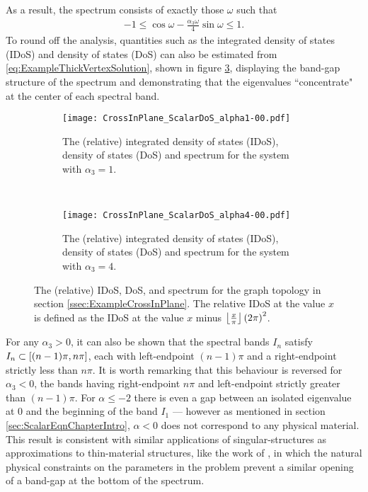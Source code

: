 As a result, the spectrum consists of exactly those $\omega$ such that
\begin{align*}
	-1 \leq \cos\omega - \frac{\alpha_3\omega}{4}\sin\omega \leq 1.
\end{align*}
To round off the analysis, quantities such as the integrated density of states (IDoS) and density of states (DoS) can also be estimated from \eqref{eq:ExampleThickVertexSolution}, shown in figure \ref{fig:CrossInPlane_ScalarDoS}, displaying the band-gap structure of the spectrum and demonstrating that the eigenvalues ``concentrate" at the center of each spectral band.
\begin{figure}[b!]
	\begin{subfigure}[t]{0.45\textwidth}
		\centering
		\texttt{[image: CrossInPlane\_ScalarDoS\_alpha1-00.pdf]}
		\caption{\label{fig:CrossInPlane_ScalarDoS_alpha1-00} The (relative) integrated density of states (IDoS), density of states (DoS) and spectrum for the system with $\alpha_3=1$.}
	\end{subfigure}
	~
	\begin{subfigure}[t]{0.45\textwidth}
		\centering
		\texttt{[image: CrossInPlane\_ScalarDoS\_alpha4-00.pdf]}
		\caption{\label{fig:CrossInPlane_ScalarDoS_alpha4-00} The (relative) integrated density of states (IDoS), density of states (DoS) and spectrum for the system with $\alpha_3=4$.}
	\end{subfigure}	
	\caption{\label{fig:CrossInPlane_ScalarDoS} The (relative) IDoS, DoS, and spectrum for the graph topology in section \ref{ssec:ExampleCrossInPlane}.
	The relative IDoS at the value $x$ is defined as the IDoS at the value $x$ minus $\left\lfloor\frac{x}{\pi}\right\rfloor\left( 2\pi \right)^2$.}
\end{figure}
For any $\alpha_3>0$, it can also be shown that the spectral bands $I_n$ satisfy $I_n\subset\left[ (n-1)\pi, n\pi \right]$, each with left-endpoint $(n-1)\pi$ and a right-endpoint strictly less than $n\pi$.
It is worth remarking that this behaviour is reversed for $\alpha_3<0$, the bands having right-endpoint $n\pi$ and left-endpoint strictly greater than $(n-1)\pi$.
For $\alpha\leq-2$ there is even a gap between an isolated eigenvalue at $0$ and the beginning of the band $I_1$ --- however as mentioned in section \ref{sec:ScalarEqnChapterIntro}, $\alpha<0$ does not correspond to any physical material.
This result is consistent with similar applications of singular-structures as approximations to thin-material structures, like the work of \cite{cherednichenko2019time}, in which the natural physical constraints on the parameters in the problem prevent a similar opening of a band-gap at the bottom of the spectrum.
